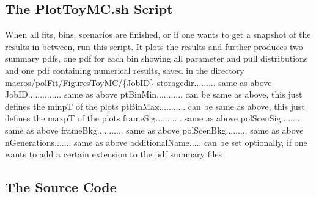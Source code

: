 \documentclass{article}
\begin{document}
\subsection{The PlotToyMC.sh Script}

When all fits, bins, scenarios are finished, or if one wants to get a snapshot of the
results in between, run this script. It plots the results and
further produces two summary pdfs, one pdf for each bin showing all parameter and pull
distributions and one pdf containing numerical results, saved in the directory macros/polFit/FiguresToyMC/\{JobID\}
\newline storagedir......... same as above
\newline JobID.............. same as above
\newline ptBinMin........... can be same as above, this just defines the minpT of the plots
\newline ptBinMax........... can be same as above, this just defines the maxpT of the plots
\newline frameSig........... same as above
\newline polScenSig......... same as above
\newline frameBkg........... same as above
\newline polScenBkg......... same as above
\newline nGenerations....... same as above
\newline additionalName..... can be set optionally, if one wants to add a certain extension to the pdf summary files


\subsection{The Source Code}
\end{document}

